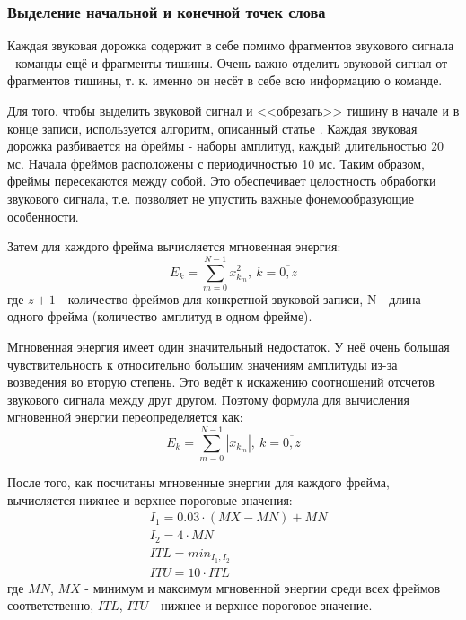 \subsubsection{Выделение начальной и конечной точек слова}
Каждая звуковая дорожка содержит в себе помимо фрагментов звукового сигнала - команды ещё и фрагменты тишины. Очень важно отделить звуковой сигнал от фрагментов тишины, т. к. именно он несёт в себе всю информацию о команде. 

Для того, чтобы выделить звуковой сигнал и <<обрезать>> тишину в начале и в конце записи, используется алгоритм, описанный статье \cite{SignalPreprocessing}. 
Каждая звуковая дорожка разбивается на фреймы - наборы амплитуд, каждый длительностью 20 мс. Начала фреймов расположены с периодичностью 10 мс. Таким образом, фреймы пересекаются между собой. Это обеспечивает целостность обработки звукового сигнала, т.е. позволяет не упустить важные фонемообразующие особенности.

Затем для каждого фрейма вычисляется мгновенная энергия:
\begin{equation}
E_k = \sum_{m=0}^{N-1} x_{k_m}^2,~k=\overline{0,z}
\end{equation}
где $z+1$ - количество фреймов для конкретной звуковой записи, N - длина одного фрейма (количество амплитуд в одном фрейме).

Мгновенная энергия имеет один значительный недостаток. У неё очень большая чувствительность к относительно большим значениям амплитуды из-за возведения во вторую степень. Это ведёт к искажению соотношений отсчетов звукового сигнала между друг другом. Поэтому формула для вычисления мгновенной энергии переопределяется как:
\begin{equation}
\label{eq:instant_energy}
E_k = \sum_{m=0}^{N-1} |x_{k_m}|,~k=\overline{0,z}
\end{equation}

После того, как посчитаны мгновенные энергии для каждого фрейма, вычисляется нижнее и верхнее пороговые значения:
\begin{equation}
\begin{aligned}
& I_1 = 0.03 \cdot (MX - MN) + MN \\
& I_2 = 4 \cdot MN \\
& ITL = min_{I_1, I_2} \\
& ITU = 10 \cdot ITL
\end{aligned}
\end{equation}
где $MN$, $MX$ - минимум и максимум мгновенной энергии среди всех фреймов соответственно, $ITL$, $ITU$ - нижнее и верхнее пороговое значение.

